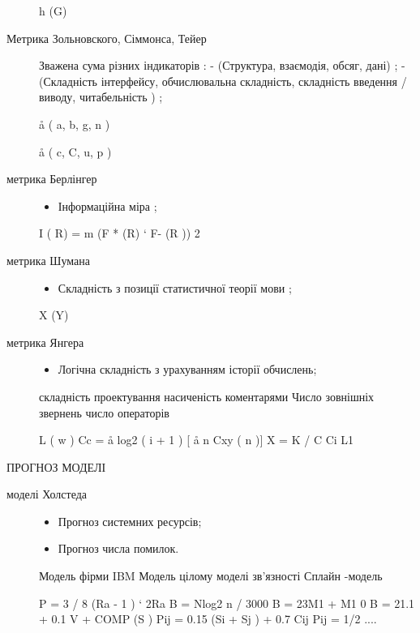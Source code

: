 \begin{description}
h (G)

\item[{Метрика Зольновского, Сіммонса, Тейер}] \leavevmode
Зважена сума різних індикаторів :
- (Структура, взаємодія, обсяг, дані) ;
- (Складність інтерфейсу, обчислювальна складність, складність введення / виводу, читабельність ) ;

å ( a, b, g, n )

å ( c, C, u, p )

\item[{метрика Берлінгер}] \leavevmode\begin{itemize}
\item {} 
Інформаційна міра ;

\end{itemize}

I ( R) = m (F * (R) ` F- (R )) 2

\item[{метрика Шумана}] \leavevmode\begin{itemize}
\item {} 
Складність з позиції статистичної теорії мови ;

\end{itemize}

X (Y)

\item[{метрика Янгера}] \leavevmode\begin{itemize}
\item {} 
Логічна складність з урахуванням історії обчислень;

\end{itemize}

складність проектування
насиченість коментарями
Число зовнішніх звернень
число операторів

L ( w )
Cc = å log2 ( i + 1 ) {[} å n Cxy ( n ){]}
X = K / C
Ci
L1

\end{description}

ПРОГНОЗ МОДЕЛІ
\begin{description}
\item[{моделі Холстеда}] \leavevmode\begin{itemize}
\item {} 
Прогноз системних ресурсів;

\item {} 
Прогноз числа помилок.

\end{itemize}

Модель фірми IBM
Модель цілому
моделі зв'язності
Сплайн -модель

P = 3 / 8 (Ra - 1 ) ` 2Ra
B = Nlog2 n / 3000
B = 23M1 + M1 0
B = 21.1 + 0.1 V + COMP (S )
Pij = 0.15 (Si + Sj ) + 0.7 Cij
Pij = 1/2 ....

\end{description}

